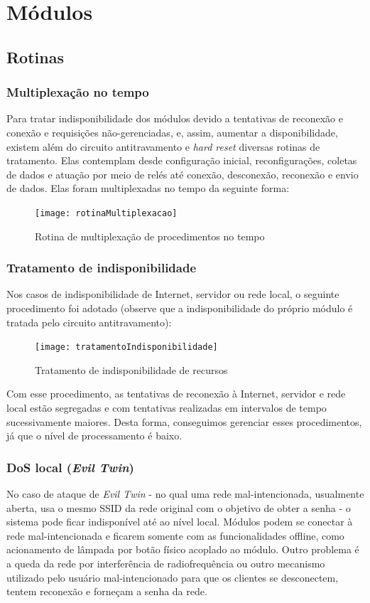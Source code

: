 \section{Módulos}
\subsection {Rotinas}
\subsubsection{Multiplexação no tempo}
Para tratar indisponibilidade dos módulos devido a tentativas de reconexão e conexão e requisições não-gerenciadas, e, assim, aumentar a disponibilidade, existem além do circuito antitravamento e \textit{hard reset} diversas rotinas de tratamento. Elas contemplam desde configuração inicial, reconfigurações, coletas de dados e atuação por meio de relés até conexão, desconexão, reconexão e envio de dados. Elas foram multiplexadas no tempo da seguinte forma:

\begin{figure} [H]
	\centering
	\caption{Rotina de multiplexação de procedimentos no tempo}
  \texttt{[image: rotinaMultiplexacao]}
\label{fig:rotinaMultiplexacao}
\end{figure}

\subsubsection{Tratamento de indisponibilidade}
Nos casos de indisponibilidade de Internet, servidor ou rede local, o seguinte procedimento foi adotado (observe que a indisponibilidade do próprio módulo é tratada pelo circuito antitravamento):

\begin{figure}[H]
	\centering
	\caption{Tratamento de indisponibilidade de recursos}
  \texttt{[image: tratamentoIndisponibilidade]}
\label{fig:tratamentoIndisponibilidade}
\end{figure}

Com esse procedimento, as tentativas de reconexão à Internet, servidor e rede local estão segregadas e com tentativas realizadas em intervalos de tempo sucessivamente maiores. Desta forma, conseguimos gerenciar esses procedimentos, já que o nível de processamento é baixo.

\subsubsection{DoS local (\textit{Evil Twin})}
No caso de ataque de \textit{Evil Twin} - no qual uma rede mal-intencionada, usualmente aberta, usa o mesmo SSID da rede original com o objetivo de obter a senha - o sistema pode ficar indisponível até ao nível local. Módulos podem se conectar à rede mal-intencionada e ficarem somente com as funcionalidades offline, como acionamento de lâmpada por botão físico acoplado ao módulo. Outro problema é a queda da rede por interferência de radiofrequência ou outro mecanismo utilizado pelo usuário mal-intencionado para que os clientes se desconectem, tentem reconexão e forneçam a senha da rede.

